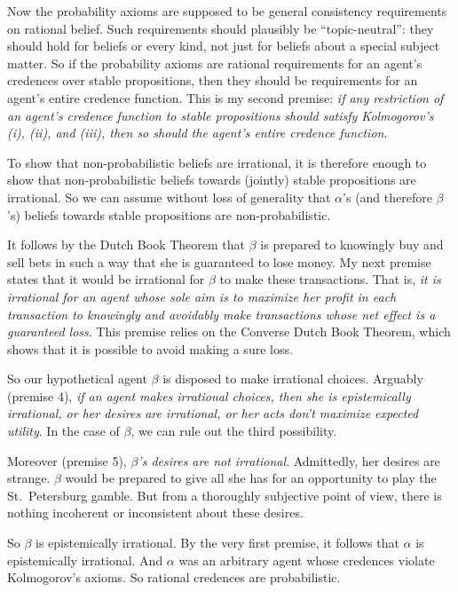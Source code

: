 Now the probability axioms are supposed to be general consistency
requirements on rational belief. Such requirements should plausibly be
``topic-neutral'': they should hold for beliefs or every kind, not
just for beliefs about a special subject matter. So if the probability
axioms are rational requirements for an agent's credences over stable
propositions, then they should be requirements for an agent's
entire credence function. This is my second premise: \emph{if any
  restriction of an agent's credence function to stable propositions
  should satisfy Kolmogorov's (i), (ii), and (iii), then so should the
  agent's entire credence function}.

To show that non-probabilistic beliefs are irrational, it is therefore
enough to show that non-probabilistic beliefs towards (jointly) stable
propositions are irrational. So we can assume without loss of
generality that $\alpha$'s (and therefore $\beta$'s) beliefs towards
stable propositions are non-probabilistic.

It follows by the Dutch Book Theorem that $\beta$ is prepared to
knowingly buy and sell bets in such a way that she is guaranteed to
lose money. My next premise states that it would be irrational for
$\beta$ to make these transactions. That is, \emph{it is irrational
  for an agent whose sole aim is to maximize her profit in each
  transaction to knowingly and avoidably make transactions whose net
  effect is a guaranteed loss}. This premise relies on the Converse
Dutch Book Theorem, which shows that it is possible to avoid making a
sure loss.

So our hypothetical agent $\beta$ is disposed to make irrational
choices. Arguably (premise 4), \emph{if an agent makes irrational
  choices, then she is epistemically irrational, or her desires are
  irrational, or her acts don't maximize expected utility}. In the
case of $\beta$, we can rule out the third possibility.

Moreover (premise 5), \emph{$\beta$'s desires are not irrational}.
Admittedly, her desires are strange. $\beta$ would be prepared
to give all she has for an opportunity to play the St.\ Petersburg
gamble. But from a thoroughly subjective point of view, there is
nothing incoherent or inconsistent about these desires.

So $\beta$ is epistemically irrational. By the very first premise, it
follows that $\alpha$ is epistemically irrational. And $\alpha$ was an
arbitrary agent whose credences violate Kolmogorov's axioms. So
rational credences are probabilistic.

